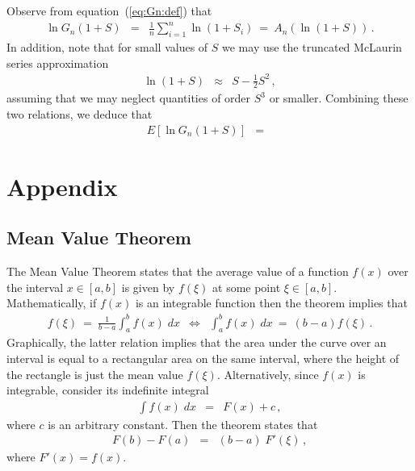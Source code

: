 \documentclass[a4paper]{book}
\begin{document}
Observe from equation~(\ref{eq:Gn:def}) that
\begin{eqnarray}
\ln G_n(1+S) & = &
\frac{1}{n}\sum_{i=1}^{n}\ln (1+S_i)~=~A_n(\ln(1+S))\,.
\end{eqnarray}
In addition, note that for small values of $S$ we may use the truncated
McLaurin series approximation
\begin{eqnarray}
\ln(1+S) & \approx & S-\frac{1}{2}S^2\,,
\end{eqnarray}
assuming that we may neglect quantities of order $S^3$ or smaller.
Combining these two relations, we deduce that
\begin{eqnarray}
E[\ln G_n(1+S)] & = &
\end{eqnarray}


\chapter{Appendix}
\section{Mean Value Theorem}
\label{sec:mean-value-theorem}
The Mean Value Theorem states that the average value of a function
$f(x)$ over the interval $x\in[a,b]$ is given by $f(\xi)$ at some
point $\xi\in[a,b]$.
Mathematically, if $f(x)$ is an integrable function
then the theorem implies that
\begin{eqnarray}
f(\xi)~=~\frac{1}{b-a}\int_{a}^{b}f(x)\;dx
& \Leftrightarrow &
\int_{a}^{b}f(x)\;dx~=~(b-a)f(\xi)\,.
\label{eq:mean-value-theorem}
\end{eqnarray}
Graphically, the latter relation implies that
the area under the curve over an interval
is equal to a rectangular area on the same interval,
where the height of the rectangle is just the mean value $f(\xi)$.
Alternatively, since $f(x)$ is integrable, consider its indefinite
integral
\begin{eqnarray*}
\int f(x)\;dx & = & F(x)+c\,,
\end{eqnarray*}
where $c$ is an arbitrary constant.
Then the theorem states that
\begin{eqnarray}
F(b)-F(a) & = & (b-a)\;F'(\xi)\,,
\end{eqnarray}
where $F'(x)=f(x)$.

\end{document}
